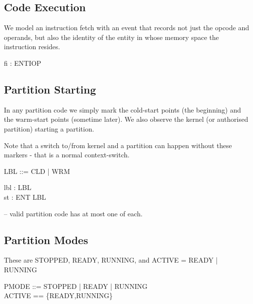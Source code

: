 \subsection{Code Execution} %

We model an instruction fetch with an event that records not just the opcode
and operands, but also the identity of the entity in whose memory space the
instruction resides.

\begin{circus}

\circchannel fi : ENT\cross I\cross OP
\end{circus}

\subsection{Partition Starting} %

In any partition code we simply mark the cold-start points (the beginning)
and the warm-start points (sometime later).
We also observe the kernel (or authorised partition) starting a partition.

Note that a switch to/from kernel and a partition can happen without these
markers - that is a normal context-switch.

\begin{circus}

LBL  %
  ::= CLD   %
  | WRM   %
\end{circus}

\begin{circus}
\circchannel lbl : LBL\\
\circchannel st : ENT \cross LBL  %
\end{circus}
-- valid partition code has at most one of each.

\subsection{Partition Modes} %
  These are STOPPED, READY, RUNNING, and ACTIVE = READY | RUNNING

\begin{circus}
PMODE ::= STOPPED | READY | RUNNING\\
ACTIVE == \{READY,RUNNING\} %
\end{circus}

